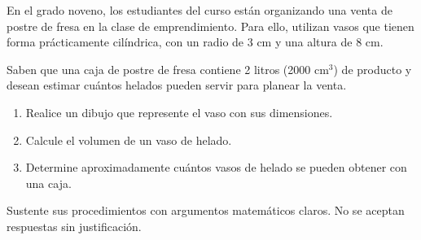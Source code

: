 En el grado noveno, los estudiantes del curso están organizando una venta de postre de fresa en la clase de emprendimiento. Para ello, utilizan vasos que tienen forma prácticamente cilíndrica, con un radio de 3 cm y una altura de 8 cm.

Saben que una caja de postre de fresa contiene 2 litros (2000 cm$^3$) de producto y desean estimar cuántos helados pueden servir para planear la venta.

\begin{enumerate}
\item Realice un dibujo que represente el vaso con sus dimensiones.
\item Calcule el volumen de un vaso de helado.
\item Determine aproximadamente cuántos vasos de helado se pueden obtener con una caja.
\end{enumerate}

Sustente sus procedimientos con argumentos matemáticos claros. No se aceptan respuestas sin justificación.